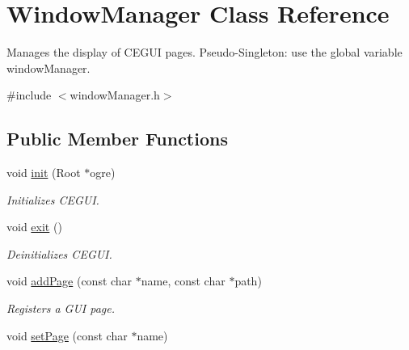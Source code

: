 \hypertarget{classWindowManager}{
\section{\-Window\-Manager \-Class \-Reference}
\label{d9/d6e/classWindowManager}
}


\-Manages the display of \-C\-E\-G\-U\-I pages. \-Pseudo-\/\-Singleton\-: use the global variable window\-Manager.  




{\ttfamily \#include $<$window\-Manager.\-h$>$}

\subsection*{\-Public \-Member \-Functions}
\begin{DoxyCompactItemize}
\item 
\hypertarget{classWindowManager_a1411956e81aab91599dba3e59668bea8}{
void \hyperlink{classWindowManager_a1411956e81aab91599dba3e59668bea8}{init} (\-Root $\ast$ogre)}
\label{d9/d6e/classWindowManager_a1411956e81aab91599dba3e59668bea8}

\begin{DoxyCompactList}\small\item\em \-Initializes \-C\-E\-G\-U\-I. \end{DoxyCompactList}\item 
\hypertarget{classWindowManager_a031f3a087bfb7c54f5f297cff164bfe0}{
void \hyperlink{classWindowManager_a031f3a087bfb7c54f5f297cff164bfe0}{exit} ()}
\label{d9/d6e/classWindowManager_a031f3a087bfb7c54f5f297cff164bfe0}

\begin{DoxyCompactList}\small\item\em \-Deinitializes \-C\-E\-G\-U\-I. \end{DoxyCompactList}\item 
\hypertarget{classWindowManager_aa131bf5caab595509c00312c91cbc706}{
void \hyperlink{classWindowManager_aa131bf5caab595509c00312c91cbc706}{add\-Page} (const char $\ast$name, const char $\ast$path)}
\label{d9/d6e/classWindowManager_aa131bf5caab595509c00312c91cbc706}

\begin{DoxyCompactList}\small\item\em \-Registers a \-G\-U\-I page. \end{DoxyCompactList}\item 
\hypertarget{classWindowManager_af41af6f82ceb5e057e480180c5dafed7}{
void \hyperlink{classWindowManager_af41af6f82ceb5e057e480180c5dafed7}{set\-Page} (const char $\ast$name)}
\label{d9/d6e/classWindowManager_af41af6f82ceb5e057e480180c5dafed7}


\end{DoxyCompactItemize}
